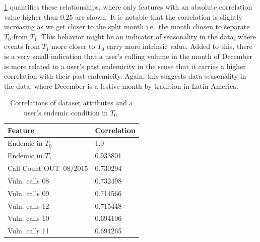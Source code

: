 \cref{tab:featureCorrelations} quantifies these relationships, where only features with an absolute correlation value higher than $0.25$ are shown.
It is notable that the correlation is slightly increasing as we get closer to the split month i.e.\ the month chosen to separate $T_0$ from $T_1$.
This behavior might be an indicator of seasonality in the data, where events from $T_1$ more closer to $T_0$ carry more intrinsic value.
Added to this, there is a very small indication that a user's calling volume in the month of December is more related to a user's past endemicity in the sense that it carries a higher correlation with their past endemicity.
Again, this suggests data seasonality in the data, where December is a festive month by tradition in Latin America.


\begin{table}
	\caption{Correlations of dataset attributes and a user's endemic condition in $T_0$.}
	\label{tab:featureCorrelations}
	\centering
	\begin{tabular}{l l }
		\toprule
		Feature & Correlation \\
		\midrule
		Endemic in $T_0$        & 1.0 \\
		Endemic in $T_1$        & 0.933801 \\
		Call Count  OUT\ 08/2015  & 0.730294 \\
		Vuln. calls  08 &0.732498 \\
		Vuln. calls  09   &0.714566 \\
		Vuln. calls 12  &0.715448 \\
		Vuln. calls  10  &0.694106 \\
		Vuln. calls  11   &0.694265 \\
		\bottomrule
	\end{tabular}
\end{table}


